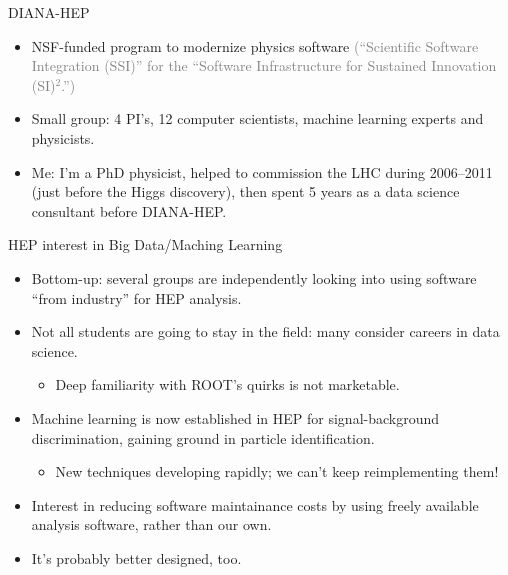 \documentclass{beamer}
\begin{document}
\begin{frame}{DIANA-HEP}
\begin{itemize}\setlength{\itemsep}{0.5 cm}
\item NSF-funded program to modernize physics software \textcolor{gray}{(``Scientific Software Integration (SSI)'' for the ``Software Infrastructure for Sustained Innovation (SI)$^2$.'')}
\item Small group: 4 PI's, 12 computer scientists, machine learning experts and physicists.
\item Me: I'm a PhD physicist, helped to commission the LHC during 2006--2011 (just before the Higgs discovery), then spent 5 years as a data science consultant before DIANA-HEP.
\end{itemize}
\end{frame}

\begin{frame}{HEP interest in Big Data/Maching Learning}
\vspace{0.25 cm}
\begin{itemize}\setlength{\itemsep}{0.25 cm}
\item Bottom-up: several groups are independently looking into using software ``from industry'' for HEP analysis.
\item Not all students are going to stay in the field: many consider careers in data science.
\begin{itemize}
\item Deep familiarity with ROOT's quirks is not marketable.
\end{itemize}
\item Machine learning is now established in HEP for signal-background discrimination, gaining ground in particle identification.
\begin{itemize}
\item New techniques developing rapidly; we can't keep reimplementing them!
\end{itemize}
\item Interest in reducing software maintainance costs by using freely available analysis software, rather than our own.
\item It's probably better designed, too.
\end{itemize}
\end{frame}
\end{document}

